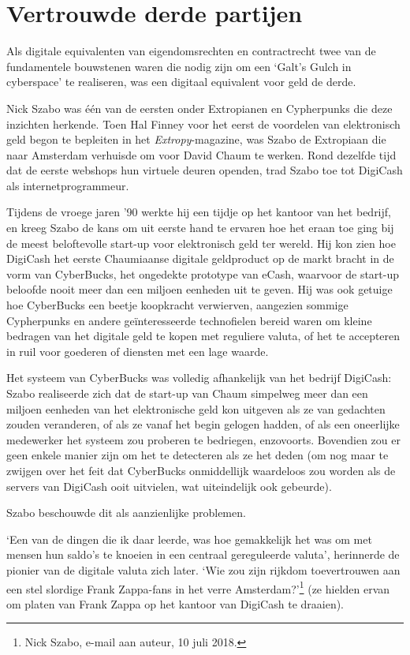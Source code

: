 \documentclass[
  a5paper,
  smalldemyvopaper,11pt,twoside,onecolumn,openright,extrafontsizes]{memoir}
\begin{document}
\section{Vertrouwde derde partijen}\label{vertrouwde-derde-partijen}

Als digitale equivalenten van eigendomsrechten en contractrecht twee van
de fundamentele bouwstenen waren die nodig zijn om een `Galt's Gulch in
cyberspace' te realiseren, was een digitaal equivalent voor geld de
derde.

Nick Szabo was één van de eersten onder Extropianen en Cypherpunks die
deze inzichten herkende. Toen Hal Finney voor het eerst de voordelen van
elektronisch geld begon te bepleiten in het \emph{Extropy}-magazine, was
Szabo de Extropiaan die naar Amsterdam verhuisde om voor David Chaum te
werken. Rond dezelfde tijd dat de eerste webshops hun virtuele deuren
openden, trad Szabo toe tot DigiCash als internetprogrammeur.

Tijdens de vroege jaren '90 werkte hij een tijdje op het kantoor van het
bedrijf, en kreeg Szabo de kans om uit eerste hand te ervaren hoe het
eraan toe ging bij de meest beloftevolle start-up voor elektronisch geld
ter wereld. Hij kon zien hoe DigiCash het eerste Chaumiaanse digitale
geldproduct op de markt bracht in de vorm van CyberBucks, het ongedekte
prototype van eCash, waarvoor de start-up beloofde nooit meer dan een
miljoen eenheden uit te geven. Hij was ook getuige hoe CyberBucks een
beetje koopkracht verwierven, aangezien sommige Cypherpunks en andere
geïnteresseerde technofielen bereid waren om kleine bedragen van het
digitale geld te kopen met reguliere valuta, of het te accepteren in
ruil voor goederen of diensten met een lage waarde.

Het systeem van CyberBucks was volledig afhankelijk van het bedrijf
DigiCash: Szabo realiseerde zich dat de start-up van Chaum simpelweg
meer dan een miljoen eenheden van het elektronische geld kon uitgeven
als ze van gedachten zouden veranderen, of als ze vanaf het begin
gelogen hadden, of als een oneerlijke medewerker het systeem zou
proberen te bedriegen, enzovoorts. Bovendien zou er geen enkele manier
zijn om het te detecteren als ze het deden (om nog maar te zwijgen over
het feit dat CyberBucks onmiddellijk waardeloos zou worden als de
servers van DigiCash ooit uitvielen, wat uiteindelijk ook gebeurde).

Szabo beschouwde dit als aanzienlijke problemen.

`Een van de dingen die ik daar leerde, was hoe gemakkelijk het was om
met mensen hun saldo's te knoeien in een centraal gereguleerde valuta',
herinnerde de pionier van de digitale valuta zich later. `Wie zou zijn
rijkdom toevertrouwen aan een stel slordige Frank Zappa-fans in het
verre Amsterdam?'\footnote{Nick Szabo, e-mail aan auteur, 10 juli 2018.}
(ze hielden ervan om platen van Frank Zappa op het kantoor van DigiCash
te draaien).
\end{document}
